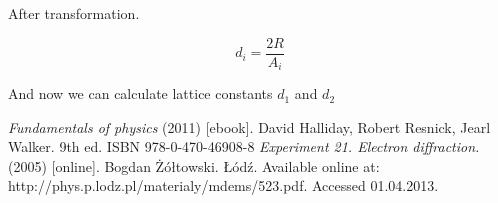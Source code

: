 \documentclass[a4paper,12pt]{article}
\begin{document}
After transformation.

\begin{equation}
    d_i = \frac{2R}{A_i}
\end{equation}

And now we can calculate lattice constants $d_1$ and $d_2$



\begin{thebibliography}{9}
    \emph{Fundamentals of physics} (2011) [ebook]. David Halliday, Robert Resnick, Jearl Walker. 9th ed. ISBN 978-0-470-46908-8
    \emph{Experiment 21. Electron diffraction.} (2005) [online]. Bogdan Żółtowski. Łódź. Available online at: http://phys.p.lodz.pl/materialy/mdems/523.pdf. Accessed 01.04.2013.  
\end{thebibliography}
\end{document}
